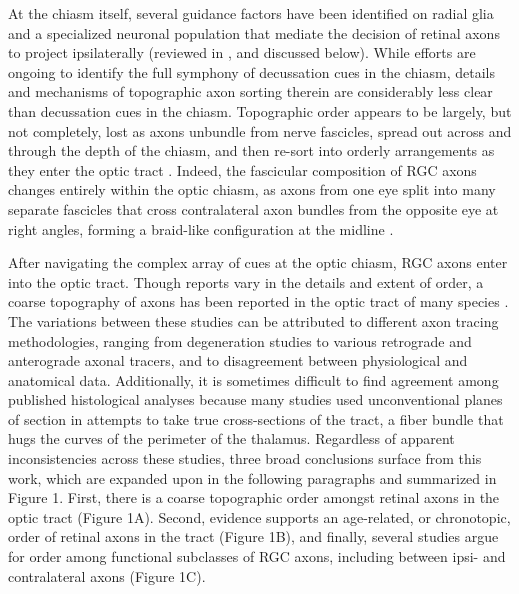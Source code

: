At the chiasm itself, several guidance factors have been identified on radial glia and a specialized neuronal population that mediate the decision of retinal axons to project ipsilaterally (reviewed in \cite{petros2008retinal}, and discussed below). 
While efforts are ongoing to identify the full symphony of decussation cues in the chiasm, details and mechanisms of topographic axon sorting therein are considerably less clear than decussation cues in the chiasm. 
Topographic order appears to be largely, but not completely, lost as axons unbundle from nerve fascicles, spread out across and through the depth of the chiasm, and then re-sort into orderly arrangements as they enter the optic tract \cite{chan1999changes, chan1994changes}. 
Indeed, the fascicular composition of RGC axons changes entirely within the optic chiasm, as axons from one eye split into many separate fascicles that cross contralateral axon bundles from the opposite eye at right angles, forming a braid-like configuration at the midline \cite{colello1998changing}. 

After navigating the complex array of cues at the optic chiasm, RGC axons enter into the optic tract. 
Though reports vary in the details and extent of order, a coarse topography of axons has been reported in the optic tract of many species \cite{chan1999changes, chan1994changes, plas2005pretarget, reese1993reestablishment, reh1983organization, torrealba1982studies}. 
The variations between these studies can be attributed to different axon tracing methodologies, ranging from degeneration studies to various retrograde and anterograde axonal tracers, and to disagreement between physiological and anatomical data. 
Additionally, it is sometimes difficult to find agreement among published histological analyses because many studies used unconventional planes of section in attempts to take true cross-sections of the tract, a fiber bundle that hugs the curves of the perimeter of the thalamus. 
Regardless of apparent inconsistencies across these studies, three broad conclusions surface from this work, which are expanded upon in the following paragraphs and summarized in Figure 1. 
First, there is a coarse topographic order amongst retinal axons in the optic tract (Figure 1A). 
Second, evidence supports an age-related, or chronotopic, order of retinal axons in the tract (Figure 1B), and finally, several studies argue for order among functional subclasses of RGC axons, including between ipsi- and contralateral axons (Figure 1C). 

